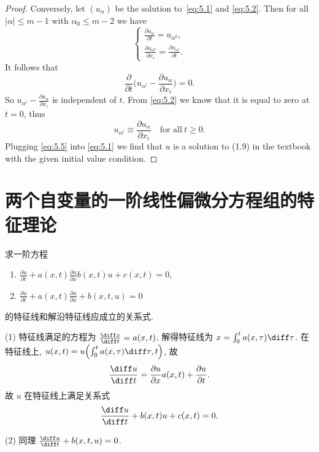 \begin{proof}
  Conversely, let $(u_\alpha)$ be the solution to~\eqref{eq:5.1} and \eqref{eq:5.2}.
  Then for all $|\alpha|\leq m-1$ with $\alpha_0\leq m-2$ we have
  \begin{equation}\label{eq:5.3}
    \begin{cases}
      \frac{\partial u_\alpha}{\partial t} = u_{\alpha^0}, \\
      \frac{\partial u_{\alpha^0}}{\partial x_i} = \frac{\partial u_{\alpha^i}}{\partial t}.
    \end{cases}
  \end{equation}
  It follows that
  \begin{equation}\label{eq:5.4}
    \frac{\partial}{\partial t}\biggl(u_{\alpha^i} - \frac{\partial u_\alpha}{\partial x_i}\biggr)
      = 0.
  \end{equation}
  So $u_{\alpha^i} - \frac{\partial u_\alpha}{\partial x_i}$ is independent of $t$.
  From \eqref{eq:5.2} we know that it is equal to zero at $t=0$, thus
  \begin{equation}\label{eq:5.5}
    u_{\alpha^i} \equiv \frac{\partial u_\alpha}{\partial x_i} \quad \text{for all}\ t\geq 0.
  \end{equation}
  Plugging \eqref{eq:5.5} into \eqref{eq:5.1} we find that $u$ is a solution to (1.9)
  in the textbook with the given initial value condition.
\end{proof}

\section{两个自变量的一阶线性偏微分方程组的特征理论}

\begin{exercise}
  求一阶方程
  \begin{enumerate}[(1)]
    \item $\frac{\partial u}{\partial t} + a(x,t) \frac{\partial u}{\partial x} 
      b(x,t)u + c(x,t) = 0$,
    \item $\frac{\partial u}{\partial t} + a(x,t) \frac{\partial u}{\partial x}
      + b(x,t,u) = 0$
  \end{enumerate}
  的特征线和解沿特征线应成立的关系式.
\end{exercise}

\begin{solve}
  (1) 特征线满足的方程为 $\frac{\diff x}{\diff t} = a(x,t)$,
  解得特征线为 $x = \int_0^t a(x,\tau) \diff\tau$.
  在特征线上, $u(x,t) = u\Bigl(\int_0^t a(x, \tau) \diff\tau, t\Bigr)$, 故
  \[\frac{\diff u}{\diff t} = \frac{\partial u}{\partial x} a(x,t)
    + \frac{\partial u}{\partial t}.\]
  故 $u$ 在特征线上满足关系式
  \[\frac{\diff u}{\diff t} + b(x,t)u + c(x,t) = 0.\]

  (2) 同理 $\frac{\diff u}{\diff t} + b(x,t,u) = 0$.
\end{solve}


